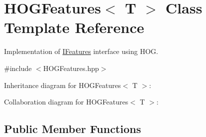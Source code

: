 \hypertarget{classHOGFeatures}{}\section{H\+O\+G\+Features$<$ T $>$ Class Template Reference}
\label{classHOGFeatures}


Implementation of \hyperlink{classIFeatures}{I\+Features} interface using H\+O\+G.  




{\ttfamily \#include $<$H\+O\+G\+Features.\+hpp$>$}



Inheritance diagram for H\+O\+G\+Features$<$ T $>$\+:


Collaboration diagram for H\+O\+G\+Features$<$ T $>$\+:
\subsection*{Public Member Functions}
